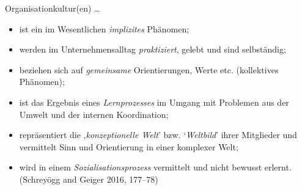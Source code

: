 \documentclass[
  letterpaper,
]{book}
\begin{document}
Organisationkultur(en) \ldots{}

\begin{itemize}
\item
  ist ein im Wesentlichen \emph{implizites} Phänomen;
\item
  werden im Unternehmensalltag \emph{praktiziert}, gelebt und sind
  selbständig;
\item
  beziehen sich auf \emph{gemeinsame} Orientierungen, Werte etc.
  (kollektives Phänomen);
\item
  ist das Ergebnis eines \emph{Lernprozesses} im Umgang mit Problemen
  aus der Umwelt und der internen Koordination;
\item
  repräsentiert die ‚\emph{konzeptionelle Welt}' bzw. `\emph{Weltbild}'
  ihrer Mitglieder und vermittelt Sinn und Orientierung in einer
  komplexer Welt;
\item
  wird in einem \emph{Sozialisationsprozess} vermittelt und nicht
  bewusst erlernt. (Schreyögg and Geiger 2016, 177--78)
\end{itemize}
\end{document}
